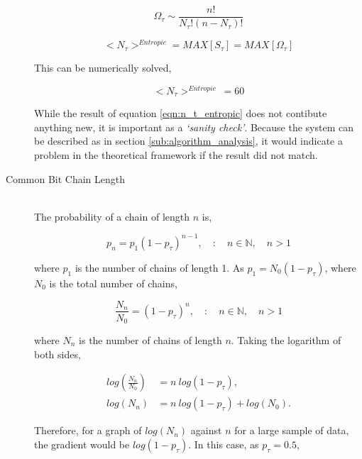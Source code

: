 \begin{description}
			\begin{equation}
				\Omega_\tau \sim \frac{n!}{N_{\tau}!(n-N_{\tau})!}
			\end{equation}

			\begin{equation}
				<N_\tau>^{Entropic} = MAX[S_\tau] = MAX[\Omega_\tau]
			\end{equation}

			This can be numerically solved,

			\begin{equation}
				<N_\tau>^{Entropic}\ = 60
				\label{eqn:n_t_entropic}
			\end{equation}

			While the result of equation \ref{eqn:n_t_entropic} does not contibute anything new, it is important as a \textit{`sanity check'}.
			Because the system can be described as in section \ref{sub:algorithm_analysis}, it would indicate a problem in the theoretical framework if the result did not match.


		\item[Common Bit Chain Length] \hfill \\
			
			The probability of a chain of length $n$ is,

			\begin{equation}
				p_n = p_1(1 - p_\tau)^{n-1}, \quad : \quad n \in \mathbb{N}, \quad n > 1
			\end{equation}

			where $p_1$ is the number of chains of length 1. 
			As $p_1 = N_0 (1 -p_\tau)$, where $N_0$ is the total number of chains,

			\begin{equation}
				\frac{N_n}{N_0} = (1 - p_\tau)^n, \quad : \quad n \in \mathbb{N}, \quad n > 1
			\end{equation}

			where $N_n$ is the number of chains of length $n$.
			Taking the logarithm of both sides,

			\begin{align}
				log\left(\frac{N_n}{N_0}\right) &= n\ log(1 - p_\tau), \nonumber \\
					log(N_n) &= n\  log(1 - p_\tau) + log(N_0).
				\end{align}

			Therefore, for a graph of $log(N_n)$ against $n$ for a large sample of data, the gradient would be $log(1 - p_\tau)$.
			In this case, as $p_\tau = 0.5$, 


\end{description}
